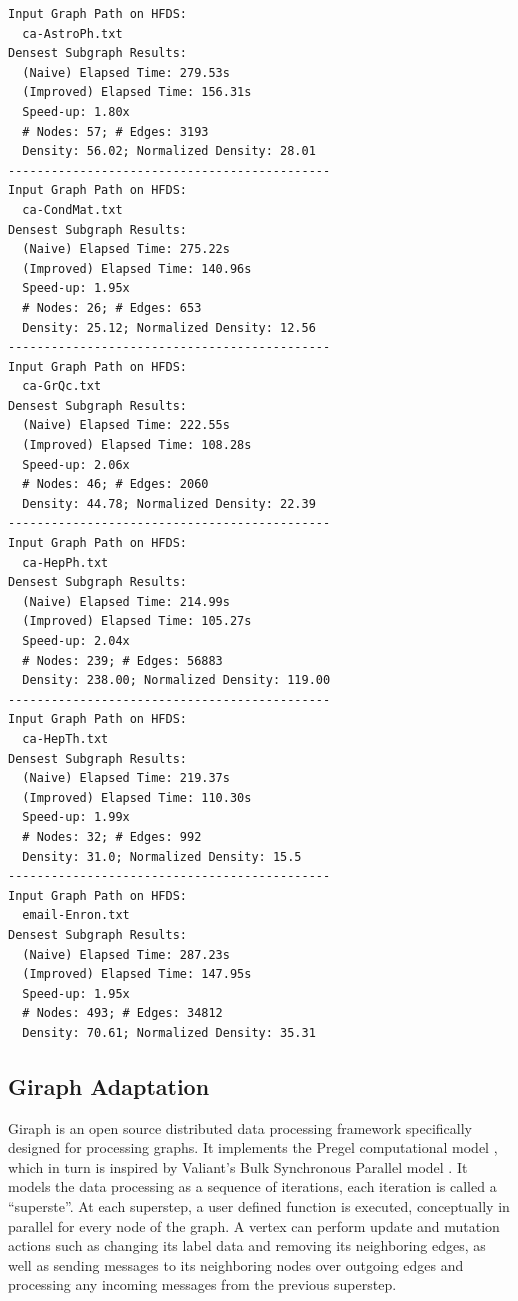 \documentclass{article}
\begin{document}
\footnotesize
\begin{lstlisting}[mathescape=true]
Input Graph Path on HFDS: 
  ca-AstroPh.txt
Densest Subgraph Results:
  (Naive) Elapsed Time: 279.53s
  (Improved) Elapsed Time: 156.31s
  Speed-up: 1.80x
  # Nodes: 57; # Edges: 3193
  Density: 56.02; Normalized Density: 28.01
---------------------------------------------
Input Graph Path on HFDS: 
  ca-CondMat.txt
Densest Subgraph Results:
  (Naive) Elapsed Time: 275.22s
  (Improved) Elapsed Time: 140.96s
  Speed-up: 1.95x
  # Nodes: 26; # Edges: 653
  Density: 25.12; Normalized Density: 12.56
---------------------------------------------
Input Graph Path on HFDS: 
  ca-GrQc.txt 
Densest Subgraph Results:
  (Naive) Elapsed Time: 222.55s
  (Improved) Elapsed Time: 108.28s
  Speed-up: 2.06x
  # Nodes: 46; # Edges: 2060
  Density: 44.78; Normalized Density: 22.39
---------------------------------------------
Input Graph Path on HFDS: 
  ca-HepPh.txt
Densest Subgraph Results:
  (Naive) Elapsed Time: 214.99s
  (Improved) Elapsed Time: 105.27s
  Speed-up: 2.04x
  # Nodes: 239; # Edges: 56883
  Density: 238.00; Normalized Density: 119.00
---------------------------------------------
Input Graph Path on HFDS: 
  ca-HepTh.txt
Densest Subgraph Results:
  (Naive) Elapsed Time: 219.37s
  (Improved) Elapsed Time: 110.30s
  Speed-up: 1.99x
  # Nodes: 32; # Edges: 992
  Density: 31.0; Normalized Density: 15.5
---------------------------------------------
Input Graph Path on HFDS: 
  email-Enron.txt
Densest Subgraph Results:
  (Naive) Elapsed Time: 287.23s
  (Improved) Elapsed Time: 147.95s
  Speed-up: 1.95x
  # Nodes: 493; # Edges: 34812
  Density: 70.61; Normalized Density: 35.31
\end{lstlisting}

\subsection{Giraph Adaptation}
Giraph is an open source distributed data processing framework specifically designed for processing graphs. It implements the Pregel computational model \cite{Malewicz:2010:PSL:1807167.1807184}, which in turn is inspired by Valiant’s Bulk Synchronous Parallel model \cite{Valiant:1990:BMP:79173.79181}. It models the data processing as a sequence of iterations, each iteration is called a ``superste''. At each superstep, a user defined function is executed, conceptually in parallel for every node of the graph. A vertex can perform update and mutation actions such as changing its label data and removing its neighboring edges, as well as sending messages to its neighboring nodes over outgoing edges and processing any incoming messages from the previous superstep.
\end{document}
